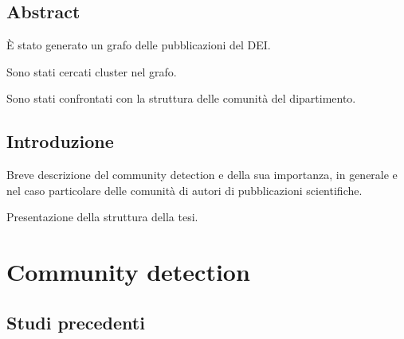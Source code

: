 \documentclass[12pt,a4paper,twoside]{report}
\begin{document}
\whitePage


\tableofcontents





\whitePage



\newpage
{}
\setcounter{page}{1}
\section*{Abstract} \label{abstract} %
È stato generato un grafo delle pubblicazioni del DEI.

Sono stati cercati cluster nel grafo.

Sono stati confrontati con la struttura delle comunità del dipartimento.


\section*{Introduzione} \label{introduzione}

Breve descrizione del community detection e della sua importanza, in generale e nel caso particolare
delle comunità di autori di pubblicazioni scientifiche.

Presentazione della struttura della tesi.



\whitePage
\chapter{Community detection} \label{cap:comdet}

\section{Studi precedenti} \label{sec:storia}
\end{document}
